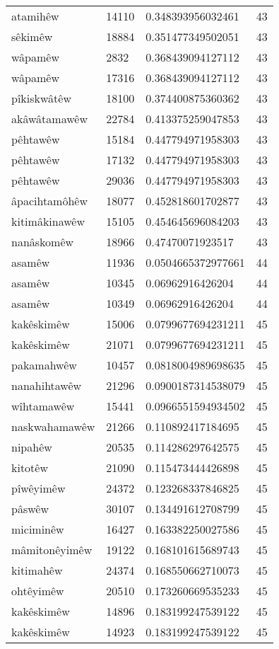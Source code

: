 \begin{longtable}{llll}
atamihêw & 14110 & 0.348393956032461 & 43\\
sêkimêw & 18884 & 0.351477349502051 & 43\\
wâpamêw & 2832 & 0.368439094127112 & 43\\
wâpamêw & 17316 & 0.368439094127112 & 43\\
pîkiskwâtêw & 18100 & 0.374400875360362 & 43\\
akâwâtamawêw & 22784 & 0.413375259047853 & 43\\
pêhtawêw & 15184 & 0.447794971958303 & 43\\
pêhtawêw & 17132 & 0.447794971958303 & 43\\
pêhtawêw & 29036 & 0.447794971958303 & 43\\
âpacihtamôhêw & 18077 & 0.452818601702877 & 43\\
kitimâkinawêw & 15105 & 0.454645696084203 & 43\\
nanâskomêw & 18966 & 0.47470071923517 & 43\\
asamêw & 11936 & 0.0504665372977661 & 44\\
asamêw & 10345 & 0.06962916426204 & 44\\
asamêw & 10349 & 0.06962916426204 & 44\\
kakêskimêw & 15006 & 0.0799677694231211 & 45\\
kakêskimêw & 21071 & 0.0799677694231211 & 45\\
pakamahwêw & 10457 & 0.0818004989698635 & 45\\
nanahihtawêw & 21296 & 0.0900187314538079 & 45\\
wîhtamawêw & 15441 & 0.0966551594934502 & 45\\
naskwahamawêw & 21266 & 0.110892417184695 & 45\\
nipahêw & 20535 & 0.114286297642575 & 45\\
kitotêw & 21090 & 0.115473444426898 & 45\\
pîwêyimêw & 24372 & 0.123268337846825 & 45\\
pâswêw & 30107 & 0.134491612708799 & 45\\
miciminêw & 16427 & 0.163382250027586 & 45\\
mâmitonêyimêw & 19122 & 0.168101615689743 & 45\\
kitimahêw & 24374 & 0.168550662710073 & 45\\
ohtêyimêw & 20510 & 0.173260669535233 & 45\\
kakêskimêw & 14896 & 0.183199247539122 & 45\\
kakêskimêw & 14923 & 0.183199247539122 & 45\\

\end{longtable}
